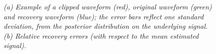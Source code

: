 \documentclass[journal]{IEEEtran}
\begin{document}

\begin{figure}[!htbp]
\centering

  \caption{\small \emph{ (a) Example of a clipped waveform (red), original waveform (green) and
  recovery waveform (blue); the error bars reflect one standard deviation, from the posterior distribution on the underlying signal. (b) Relative recovery errors (with respect to the mean estimated signal).
   }}
\end{figure}
\end{document}

